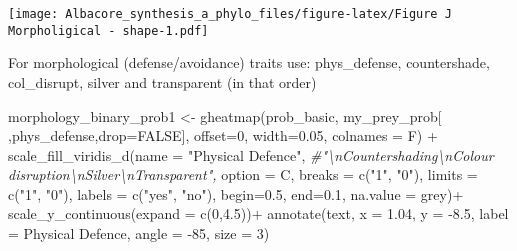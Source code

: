 \documentclass[
]{article}
\newenvironment{Shaded}{\begin{snugshade}}{\end{snugshade}}
\newcommand{\AttributeTok}[1]{\textcolor[rgb]{0.77,0.63,0.00}{#1}}
\newcommand{\CommentTok}[1]{\textcolor[rgb]{0.56,0.35,0.01}{\textit{#1}}}
\newcommand{\ConstantTok}[1]{\textcolor[rgb]{0.00,0.00,0.00}{#1}}
\newcommand{\DecValTok}[1]{\textcolor[rgb]{0.00,0.00,0.81}{#1}}
\newcommand{\FloatTok}[1]{\textcolor[rgb]{0.00,0.00,0.81}{#1}}
\newcommand{\FunctionTok}[1]{\textcolor[rgb]{0.00,0.00,0.00}{#1}}
\newcommand{\NormalTok}[1]{#1}
\newcommand{\OtherTok}[1]{\textcolor[rgb]{0.56,0.35,0.01}{#1}}
\newcommand{\SpecialCharTok}[1]{\textcolor[rgb]{0.00,0.00,0.00}{#1}}
\newcommand{\StringTok}[1]{\textcolor[rgb]{0.31,0.60,0.02}{#1}}
\begin{document}
\texttt{[image: Albacore\_synthesis\_a\_phylo\_files/figure-latex/Figure J Morpholigical - shape-1.pdf]}

For morphological (defense/avoidance) traits use: phys\_defense,
countershade, col\_disrupt, silver and transparent (in that order)

\begin{Shaded}
\begin{Highlighting}[]
\NormalTok{morphology\_binary\_prob1 }\OtherTok{\textless{}{-}} \FunctionTok{gheatmap}\NormalTok{(prob\_basic, my\_prey\_prob[ ,}\StringTok{\textquotesingle{}phys\_defense\textquotesingle{}}\NormalTok{,}\AttributeTok{drop=}\ConstantTok{FALSE}\NormalTok{], }\AttributeTok{offset=}\DecValTok{0}\NormalTok{, }\AttributeTok{width=}\FloatTok{0.05}\NormalTok{, }\AttributeTok{colnames =}\NormalTok{ F) }\SpecialCharTok{+}
  \FunctionTok{scale\_fill\_viridis\_d}\NormalTok{(}\AttributeTok{name =} \StringTok{"Physical Defence"}\NormalTok{, }\CommentTok{\#"\textbackslash{}nCountershading\textbackslash{}nColour disruption\textbackslash{}nSilver\textbackslash{}nTransparent",}
                       \AttributeTok{option =} \StringTok{\textquotesingle{}C\textquotesingle{}}\NormalTok{,}
                       \AttributeTok{breaks =} \FunctionTok{c}\NormalTok{(}\StringTok{"1"}\NormalTok{, }\StringTok{"0"}\NormalTok{),}
                       \AttributeTok{limits =} \FunctionTok{c}\NormalTok{(}\StringTok{"1"}\NormalTok{, }\StringTok{"0"}\NormalTok{),}
                       \AttributeTok{labels =} \FunctionTok{c}\NormalTok{(}\StringTok{"yes"}\NormalTok{, }\StringTok{"no"}\NormalTok{),}
                       \AttributeTok{begin=}\FloatTok{0.5}\NormalTok{, }\AttributeTok{end=}\FloatTok{0.1}\NormalTok{, }
                       \AttributeTok{na.value =} \StringTok{\textquotesingle{}grey\textquotesingle{}}\NormalTok{)}\SpecialCharTok{+}
  \FunctionTok{scale\_y\_continuous}\NormalTok{(}\AttributeTok{expand =} \FunctionTok{c}\NormalTok{(}\DecValTok{0}\NormalTok{,}\FloatTok{4.5}\NormalTok{))}\SpecialCharTok{+}
  \FunctionTok{annotate}\NormalTok{(}\StringTok{\textquotesingle{}text\textquotesingle{}}\NormalTok{, }\AttributeTok{x =} \FloatTok{1.04}\NormalTok{, }\AttributeTok{y =} \SpecialCharTok{{-}}\FloatTok{8.5}\NormalTok{, }\AttributeTok{label =} \StringTok{\textquotesingle{}Physical Defence\textquotesingle{}}\NormalTok{, }\AttributeTok{angle =} \SpecialCharTok{{-}}\DecValTok{85}\NormalTok{, }\AttributeTok{size =} \DecValTok{3}\NormalTok{)}


\end{Highlighting}
\end{Shaded}
\end{document}

